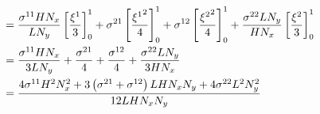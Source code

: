\begin{equation}
\begin{aligned}
    &=\dfrac{ \sigma ^{11} H N_{x}}{L N_{y}}\left[ \dfrac{\xi^{1}}{3} \right]^{1}_{0}
    + \sigma ^{21}\left[ \dfrac{{\xi^{1}}^{2}}{4} \right]^{1}_{0}
    + \sigma ^{12}\left[ \dfrac{{\xi^{2}}^{2}}{4} \right]^{1}_{0}
    +\dfrac{ \sigma ^{22} L N_{y}}{H N_{x}}\left[ \dfrac{\xi^{2}}{3} \right]^{1}_{0} \\
    &=\dfrac{ \sigma ^{11} H N_{x}}{3 L N_{y}}+\dfrac{ \sigma ^{21}}{4}+
    \dfrac{ \sigma ^{12}}{4}+\dfrac{ \sigma ^{22} L N_{y}}{3 H N_{x}} \\
    &=\dfrac{4 \sigma ^{11}H^{2}N_{x}^{2}+3\left(  \sigma ^{21}+
         \sigma ^{12} \right)L H N_{x} N_{y}+4 \sigma ^{22}L^{2}N_{y}^{2}}{12 L H N_{x} N_{y}}
  \end{aligned}
\end{equation}

